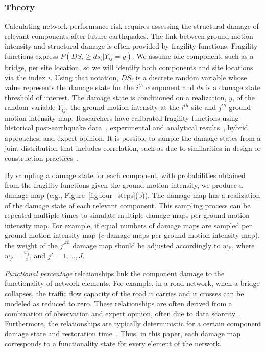 \subsubsection{Theory}
Calculating network performance risk requires assessing the structural damage of relevant components after future earthquakes. The link between ground-motion intensity and structural damage is often provided by fragility functions. Fragility functions express $P(DS_i \geq ds_{\varsigma} | Y_{ij} = y)$. We assume one component, such as a bridge, per site location, so we will identify both components and site locations via the index $i$. Using that notation, $DS_i$ is a discrete random variable whose value represents the damage state for the $i^{th}$ component and $ds$ is a damage state threshold of interest. The damage state is conditioned on a realization, $y$, of the random variable $Y_{ij}$, the ground-motion intensity at the $i^{th}$ site and $j^{th}$ ground-motion intensity map. Researchers have calibrated fragility functions using historical post-earthquake data~\cite[e.g.,][]{basoz_enhancement_1999}, experimental and analytical results~\cite[e.g.,][]{ramanathan_next_2012}, hybrid approaches, and expert opinion. It is possible to sample the damage states from  a joint distribution that includes correlation, such as due to similarities in design or construction practices~\cite[e.g.,][]{lee_uncertainty_2007}. 

By sampling a damage state for each component, with probabilities obtained from the fragility functions given the ground-motion intensity, we produce a damage map (e.g., Figure~\ref{fig:four_steps}{(b)}). The damage map has a realization of the damage state of each relevant component. This sampling process can be repeated multiple times to simulate multiple damage maps per ground-motion intensity map. For example, if equal numbers of damage maps are sampled per ground-motion intensity map ($c$ damage maps per ground-motion intensity map), the weight of the $j'^{th}$ damage map should be adjusted accordingly to $w_{j'}$, where $w_{j'} = \frac{w_j}{c}$, and $j' = 1, \ldots, J$. 

\emph{Functional percentage} relationships link the component damage to the functionality of network elements.  For example, in a road network, when a bridge collapses, the traffic flow capacity of the road it carries and it crosses can be modeled as reduced to zero. These relationships are often derived from a combination of observation and expert opinion, often due to data scarcity~\cite{werner_redars_2006}. Furthermore, the relationships are typically deterministic for a certain component damage state and restoration time~\cite{werner_redars_2006}. Thus, in this paper, each damage map corresponds to a functionality state for every element of the network.

